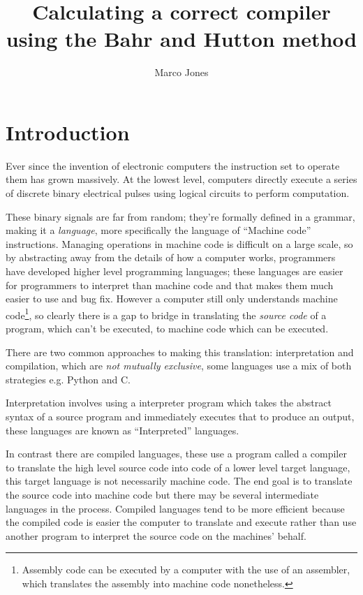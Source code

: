 \documentclass {article}
\title{Calculating a correct compiler using the Bahr and Hutton method}
\author{Marco Jones}
\begin{document}
\begin{titlepage}
\maketitle
\end{titlepage}

\tableofcontents
\clearpage

\newcommand{\BH}{Bahr and Hutton}
\newcommand{\vm}{virtual machine}

\section{Introduction}

Ever since the invention of electronic computers
the instruction set to operate them has grown massively.
At the lowest level, computers directly execute
a series of discrete binary electrical
pulses using logical circuits to perform computation.

These binary signals are far from random; they're formally
defined in a grammar, making it a \emph{language},
more specifically the language of ``Machine code'' instructions.
Managing operations in machine code is difficult on
a large scale,
so by abstracting away from the details of how a computer works,
 programmers have developed 
higher level programming languages;
these languages are easier for programmers to interpret
than machine code and that makes them much easier to use and bug fix.
However a computer still only understands machine code\footnote{
Assembly code can be executed by a computer 
with the use of an assembler,
which translates the assembly 
into machine code nonetheless.},
so clearly there is a gap to bridge in translating the 
\emph{source code} of a program, which can't be
executed, to machine code which can be executed.

There are two common approaches to making this translation:
interpretation and compilation, which are \emph{not mutually exclusive}, some languages use a mix of both 
strategies e.g. Python and C.

Interpretation involves using a
interpreter program which takes the abstract syntax of a
source program and immediately executes that to produce an output,
these languages are known as ``Interpreted'' languages.

In contrast there are compiled languages, these use 
a program called a compiler to translate the high level
source code into code of a lower level target language,
this target language is not necessarily machine code.
The end goal is to translate the source code into machine code
but there may be several intermediate languages in the process\cite[pg 8-10]{compilers}. Compiled languages tend to be more efficient
because the compiled code is easier the computer to translate
and execute rather than use another program to interpret
the source code on the machines' behalf.
\end{document}
